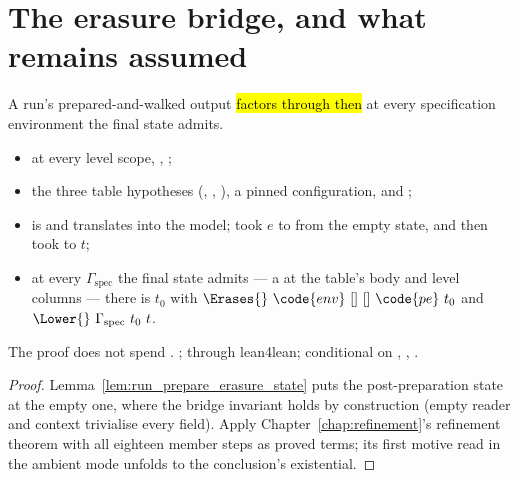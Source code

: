 \section{The erasure bridge, and what remains assumed}
\label{sec:coldstart:bridge}

\begin{theorem}
\label{thm:erasure_bridge_of_run}
\leanok
{}
 A run's prepared-and-walked output \hl{factors through \Erases{} then \Lower{}} at every
specification environment the final state admits.
\begin{itemize}
\item {}  at every level scope, , ;
\item the three table hypotheses (, , ), a
pinned configuration, and ;
\item {} is  and translates into the model;  took $e$ to
 from the empty state, and  then took  to $t$;
\item {} at every $\Gamma_{\mathrm{spec}}$ the final state admits --- a  at the
table's body and level columns --- there is $t_0$ with
$\Erases{}\ \code{env}\ []\ []\ \code{pe}\ t_0$ and $\Lower{}\ \Gamma_{\mathrm{spec}}\ t_0\ t$.
\end{itemize}
 The proof does not spend .
 \stProved{}; \stInherited{} through lean4lean; conditional on \stAssumed{}
, , .
\end{theorem}
\begin{proof}
\leanok
{}
 Lemma~\ref{lem:run_prepare_erasure_state} puts the post-preparation state at the empty one,
where the bridge invariant holds by construction (empty reader and context trivialise every field).
 Apply Chapter~\ref{chap:refinement}'s refinement theorem with all eighteen member steps as
proved terms; its first motive read in the ambient mode unfolds to the conclusion's existential.
\end{proof}
